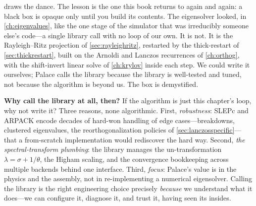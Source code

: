  draws the dance. The lesson is the one this book returns to again and again:
a black box is opaque only until you build its contents. The eigensolver looked, in
\cref{ch:eigenvalues}, like the one stage of the simulator that was irreducibly someone else's
code---a single library call with no loop of our own. It is not. It is the Rayleigh--Ritz
projection of \cref{sec:rayleighritz}, restarted by the thick-restart of \cref{sec:thickrestart},
built on the Arnoldi and Lanczos recurrences of \cref{ch:orthog}, with the shift-invert linear
solve of \cref{ch:krylov} inside each step. We could write it ourselves; Palace calls the library
because the library is well-tested and tuned, not because the algorithm is beyond us. The box is
demystified.

\begin{notationbox}
\textbf{Why call the library at all, then?} If the algorithm is just this chapter's loop, why not
write it? Three reasons, none algorithmic. First, \emph{robustness}: SLEPc and ARPACK encode
decades of hard-won handling of edge cases---breakdowns, clustered eigenvalues, the
reorthogonalization policies of \cref{sec:lanczosspecific}---that a from-scratch implementation
would rediscover the hard way. Second, \emph{the spectral-transform plumbing}: the library manages
the un-transformation $\lambda = \sigma + 1/\theta$, the Higham scaling, and the convergence
bookkeeping across multiple backends behind one interface. Third, \emph{focus}: Palace's value is in
the physics and the assembly, not in re-implementing a numerical eigensolver. Calling the library is
the right engineering choice precisely \emph{because} we understand what it does---we can configure
it, diagnose it, and trust it, having seen its insides.
\end{notationbox}

